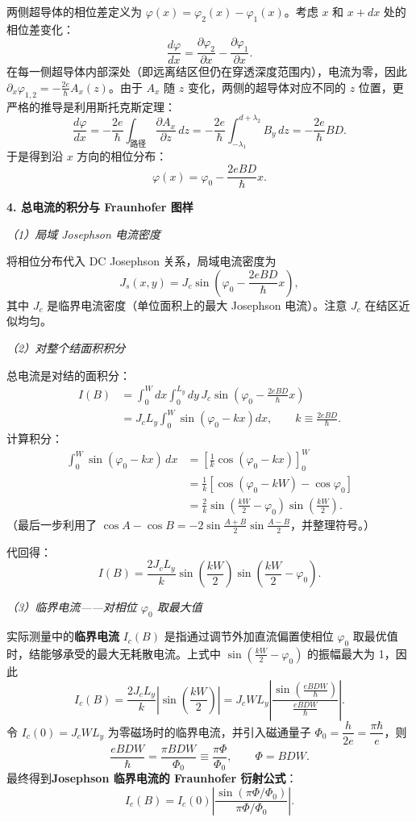 两侧超导体的相位差定义为 $\varphi(x) = \varphi_2(x) - \varphi_1(x)$。考虑 $x$ 和 $x+dx$ 处的相位差变化：
\[
\frac{d\varphi}{dx} = \frac{\partial\varphi_2}{\partial x} - \frac{\partial\varphi_1}{\partial x}.
\]
在每一侧超导体内部深处（即远离结区但仍在穿透深度范围内），电流为零，因此 $\partial_x\varphi_{1,2} = -\frac{2e}{\hbar}A_x(z)$。由于 $A_x$ 随 $z$ 变化，两侧的超导体对应不同的 $z$ 位置，更严格的推导是利用斯托克斯定理：
\[
\frac{d\varphi}{dx} = -\frac{2e}{\hbar} \int_{\text{路径}} \frac{\partial A_x}{\partial z}\,dz = -\frac{2e}{\hbar} \int_{-\lambda_1}^{d+\lambda_2} B_y\,dz = -\frac{2e}{\hbar}BD.
\]
于是得到沿 $x$ 方向的相位分布：
\[
\boxed{\varphi(x) = \varphi_0 - \frac{2eBD}{\hbar}x}.
\]

\textbf{4. 总电流的积分与 Fraunhofer 图样}

\textit{（1）局域 Josephson 电流密度}

将相位分布代入 DC Josephson 关系，局域电流密度为
\[
J_s(x,y) = J_c \sin\left( \varphi_0 - \frac{2eBD}{\hbar}x \right),
\]
其中 $J_c$ 是临界电流密度（单位面积上的最大 Josephson 电流）。注意 $J_c$ 在结区近似均匀。

\textit{（2）对整个结面积积分}

总电流是对结的面积分：
\begin{align*}
I(B) &= \int_0^W dx \int_0^{L_y} dy \, J_c \sin\left( \varphi_0 - \frac{2eBD}{\hbar}x \right) \\
&= J_c L_y \int_0^W \sin\left( \varphi_0 - kx \right) dx, \qquad k \equiv \frac{2eBD}{\hbar}.
\end{align*}
计算积分：
\begin{align*}
\int_0^W \sin(\varphi_0 - kx)\,dx &= \left[ \frac{1}{k}\cos(\varphi_0 - kx) \right]_0^W \\
&= \frac{1}{k}\left[ \cos(\varphi_0 - kW) - \cos\varphi_0 \right] \\
&= \frac{2}{k}\sin\left( \frac{kW}{2} - \varphi_0 \right) \sin\left( \frac{kW}{2} \right).
\end{align*}
（最后一步利用了 $\cos A - \cos B = -2\sin\frac{A+B}{2}\sin\frac{A-B}{2}$，并整理符号。）

代回得：
\[
I(B) = \frac{2J_c L_y}{k} \sin\left( \frac{kW}{2} \right) \sin\left( \frac{kW}{2} - \varphi_0 \right).
\]

\textit{（3）临界电流——对相位 $\varphi_0$ 取最大值}

实际测量中的\textbf{临界电流} $I_c(B)$ 是指通过调节外加直流偏置使相位 $\varphi_0$ 取最优值时，结能够承受的最大无耗散电流。上式中 $\sin(\frac{kW}{2} - \varphi_0)$ 的振幅最大为 1，因此
\[
I_c(B) = \frac{2J_c L_y}{k} \left| \sin\left( \frac{kW}{2} \right) \right|
= J_c W L_y \left| \frac{\sin\left( \frac{eBDW}{\hbar} \right)}{\frac{eBDW}{\hbar}} \right|.
\]
令 $I_c(0) = J_c W L_y$ 为零磁场时的临界电流，并引入磁通量子 $\Phi_0 = \dfrac{h}{2e} = \dfrac{\pi\hbar}{e}$，则
\[
\frac{eBDW}{\hbar} = \frac{\pi BDW}{\Phi_0} \equiv \frac{\pi\Phi}{\Phi_0}, \qquad \Phi = BDW.
\]
最终得到\textbf{Josephson 临界电流的 Fraunhofer 衍射公式}：
\[
\boxed{I_c(B) = I_c(0)\left| \frac{\sin(\pi\Phi/\Phi_0)}{\pi\Phi/\Phi_0} \right|}.
\]

